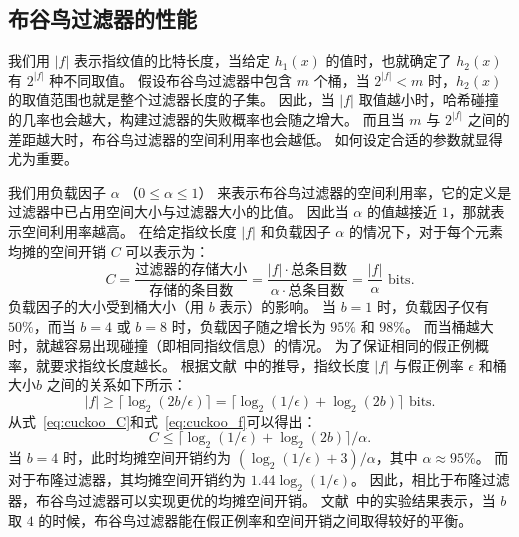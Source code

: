 \subsection{布谷鸟过滤器的性能}

我们用 $|f|$ 表示指纹值的比特长度，当给定 $h_1(x)$ 的值时，也就确定了 $h_2(x)$ 有 $2^{|f|}$ 种不同取值。
假设布谷鸟过滤器中包含 $m$ 个桶，当 $2^{|f|} < m$ 时，$h_2(x)$ 的取值范围也就是整个过滤器长度的子集。
因此，当 $|f|$ 取值越小时，哈希碰撞的几率也会越大，构建过滤器的失败概率也会随之增大。
而且当 $m$ 与 $2^{|f|}$ 之间的差距越大时，布谷鸟过滤器的空间利用率也会越低。
如何设定合适的参数就显得尤为重要。


我们用负载因子 $\alpha$ （$0\leq \alpha \leq 1$） 来表示布谷鸟过滤器的空间利用率，它的定义是过滤器中已占用空间大小与过滤器大小的比值。
因此当 $\alpha$ 的值越接近 $1$，那就表示空间利用率越高。
在给定指纹长度 $|f|$ 和负载因子 $\alpha$ 的情况下，对于每个元素均摊的空间开销 $C$ 可以表示为：
\begin{equation}
  C = \frac{\mbox{过滤器的存储大小}}{\mbox{存储的条目数}} = \frac{|f| \cdot \mbox{总条目数}}{\alpha \cdot \mbox{总条目数}} = \frac{|f|}{\alpha} \mbox{ bits}.
  \label{eq:cuckoo_C}
\end{equation}
负载因子的大小受到桶大小（用 $b$ 表示）的影响。
当 $b=1$ 时，负载因子仅有 $50\%$，而当 $b=4$ 或 $b=8$ 时，负载因子随之增长为 $95\%$ 和 $98\%$。
而当桶越大时，就越容易出现碰撞（即相同指纹信息）的情况。
为了保证相同的假正例概率，就要求指纹长度越长。
根据文献~\cite{fan2014cuckoo}中的推导，指纹长度 $|f|$ 与假正例率 $\epsilon$ 和桶大小$b$ 之间的关系如下所示：
\begin{equation}
  |f| \geq \lceil\log_2(2b / \epsilon) \rceil = \lceil \log_2(1/\epsilon) + \log_2(2b) \rceil \mbox{ bits}.
  \label{eq:cuckoo_f}
\end{equation}
从式~\ref{eq:cuckoo_C}和式~\ref{eq:cuckoo_f}可以得出：
\begin{equation}
  C \leq \lceil \log_2(1/\epsilon) + \log_2(2b) \rceil / \alpha.
  \label{eq:cuckoo_storage}
\end{equation}
当 $b=4$ 时，此时均摊空间开销约为 $(\log_2(1/\epsilon) + 3) / \alpha$，其中 $\alpha \approx 95\%$。
而对于布隆过滤器，其均摊空间开销约为 $1.44 \log_2(1/ \epsilon)$。
因此，相比于布隆过滤器，布谷鸟过滤器可以实现更优的均摊空间开销。
文献~\cite{fan2014cuckoo}中的实验结果表示，当 $b$ 取 $4$ 的时候，布谷鸟过滤器能在假正例率和空间开销之间取得较好的平衡。

